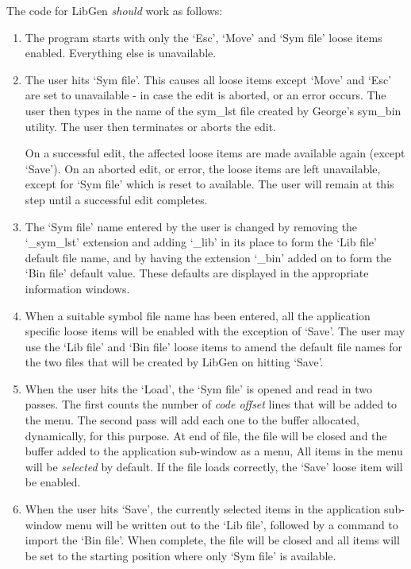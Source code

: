 The code for LibGen  \emph{should} work as follows:
\begin{enumerate}
\item{The program starts with only the `Esc', `Move' and `Sym file'
        loose items enabled. Everything else is unavailable.
}
\item{The user hits `Sym file'. This causes all loose items except
        `Move' and `Esc' are set to unavailable -{} in case the edit is aborted,
        or an error occurs. The user then types in the name of the sym\_lst
        file created by George's sym\_bin utility.
        The user then terminates or aborts the edit.

On a successful edit, the affected loose items are made
        available again (except `Save'). On an aborted edit, or error, the
        loose items are left unavailable, except for `Sym file' which is reset
        to available. The user will remain at this step until a successful
        edit completes.
}
\item{The `Sym file' name entered by the user is changed by removing
        the `\_sym\_lst' extension and adding `\_lib' in its place to form the
        `Lib file' default file name, and by having the extension `\_bin' added
        on to form the `Bin file' default value. These defaults are displayed
        in the appropriate information windows.
}
\item{When a suitable symbol file name has been entered, all the
        application specific loose items will be enabled with the exception of
        `Save'. The user may use the `Lib file' and `Bin file' loose items to
        amend the default file names for the two files that will be created by
 LibGen on hitting `Save'.
}
\item{When the user hits the `Load', the `Sym file' is opened and read
        in two passes. The first counts the number of \emph{code offset
 }lines that will be added to the menu. The second pass will
        add each one to the buffer allocated, dynamically, for this purpose.
        At end of file, the file will be closed and the buffer added to the
        application sub-{}window as a menu, All items in the menu will be
 \emph{selected} by default. If the file loads correctly,
        the `Save' loose item will be enabled.
}
\item{When the user hits `Save', the currently selected items in the
        application sub-{}window menu will be written out to the `Lib file',
        followed by a command to import the `Bin file'. When complete, the
        file will be closed and all items will be set to the starting position
        where only `Sym file' is available.
}
\end{enumerate}

